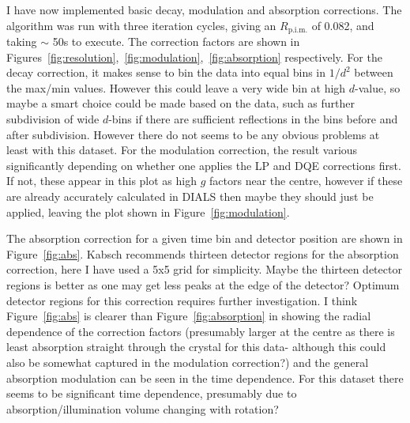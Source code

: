 \documentclass[11pt, oneside]{article}   	%
\begin{document}
I have now implemented basic decay, modulation and absorption corrections. 
The algorithm was run with three iteration cycles, giving an $R_{\text{p.i.m.}}$ of 0.082, and taking $\sim$ 50s to execute.
The correction factors are shown in Figures~\ref{fig:resolution},~\ref{fig:modulation},~\ref{fig:absorption} respectively.  
For the decay correction, it makes sense to bin the data into equal bins in $1/d^2$ between the max/min values. However this could leave a very wide bin at high $d$-value, so maybe a smart choice could be made based on the data, such as further subdivision of wide $d$-bins if there are sufficient reflections in the bins before and after subdivision. However there do not seems to be any obvious problems at least with this dataset.
For the modulation correction, the result various significantly depending on whether one applies the LP and DQE corrections first. If not, these appear in this plot as high $g$ factors near the centre, however if these are already accurately calculated in DIALS then maybe they should just be applied, leaving the plot shown in Figure~\ref{fig:modulation}.

The absorption correction for a given time bin and detector position are shown in Figure~\ref{fig:abs}. Kabsch recommends thirteen detector regions for the absorption correction, here I have used a 5x5 grid for simplicity. Maybe the thirteen detector regions is better as one may get less peaks at the edge of the detector? Optimum detector regions for this correction requires further investigation. I think Figure~\ref{fig:abs} is clearer than Figure~\ref{fig:absorption} in showing the radial dependence of the correction factors (presumably larger at the centre as there is least absorption straight through the crystal for this data- although this could also be somewhat captured in the modulation correction?) and the general absorption modulation can be seen in the time dependence. 
For this dataset there seems to be significant time dependence, presumably due to absorption/illumination volume changing with rotation?
\end{document}
